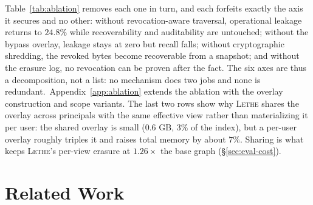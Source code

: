 \documentclass[sigconf, nonacm, review]{acmart}
\newcommand{\xmark}{\tikz[scale=0.14,baseline=-0.1ex]{\draw[line width=0.9pt,leakc,line cap=round](0,0)--(1.05,1.05) (0,1.05)--(1.05,0);}}
\newif\ifextended\extendedtrue %
\begin{document}
\begin{table}[t]
{%
}
\end{table}

Table~\ref{tab:ablation} removes each one in turn, and each forfeits
exactly the axis it secures and no other: without revocation-aware traversal,
operational leakage returns to $24.8\%$ while recoverability and
auditability are untouched; without the bypass overlay, leakage stays at zero
but recall falls; without cryptographic shredding, the
revoked bytes become recoverable from a snapshot; and without the erasure log,
no revocation can be proven after the fact. The six axes are thus a
decomposition, not a list: no mechanism does two jobs and none is redundant.\ifextended\ Appendix~\ref{app:ablation} extends the ablation with the overlay construction and scope variants.\fi
The last two rows show why \textsc{Lethe} shares the overlay across
principals with the same effective view rather than materializing it per
user: the shared overlay is small ($0.6$ GB, $3\%$ of the index), but a
per-user overlay roughly triples it and raises total memory by about
$7\%$. Sharing is what keeps \textsc{Lethe}'s per-view erasure at
$1.26\times$ the base graph (\S\ref{sec:eval-cost}).

\section{Related Work}
\label{sec:related}
\end{document}
